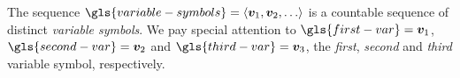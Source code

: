
The sequence $\gls{variable-symbols} = \seq{\vv1,\vv2,\dots}$ is a countable
sequence of distinct \emph{variable symbols}.
We pay special attention to $\gls{first-var} = \vv1$, $\gls{second-var} = \vv2$
and $\gls{third-var} = \vv3$, the \emph{first}, \emph{second} and \emph{third}
variable symbol, respectively.